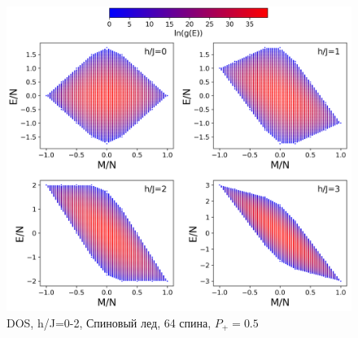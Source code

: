 \documentclass[utf8, babel, sor, jor, amsmath, amssymb, reprint]{elsarticle} %
\begin{document}
\begin{figure}[H]
	\centering
	\includegraphics[width=1\linewidth]{pictures/HDOS_SI_64_J0_1.png}
	\caption{DOS, h/J=0-2, Спиновый лед, 64 спина, $P_+ = 0.5$}
	\label{fig:HDOS_ice_1}
\end{figure}
\end{document}
